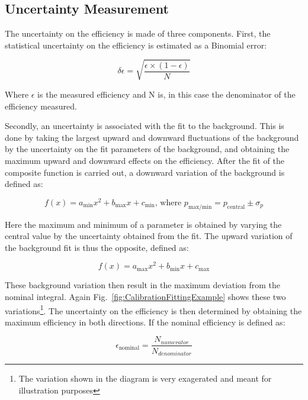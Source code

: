 \subsection{Uncertainty Measurement}

The uncertainty on the efficiency is made of three components. First, the statistical uncertainty on the efficiency is estimated as a Binomial error:

\begin{equation}
  \delta\epsilon = \sqrt{\frac{\epsilon\times(1-\epsilon)}{N}}
\end{equation}

Where $\epsilon$ is the measured efficiency and N is, in this case the denominator of the efficiency measured.

Secondly, an uncertainty is associated with the fit to the background. This is done by taking the largest upward and downward fluctuations of the background by the uncertainty on the fit parameters of the background, and obtaining the maximum upward and downward effects on the efficiency. 
After the fit of the composite function is carried out, a downward variation of the background is defined as:

\begin{equation}
  f(x) = a_{\text{min}}x^{2} + b_{\text{max}}x + c_{\text{min}}\text{, where }p_{\text{max/min}}=p_{\text{central}}\pm\sigma_{p}
\end{equation}

Here the maximum and minimum of a parameter is obtained by varying the central value by the uncertainty obtained from the fit. The upward variation of the background fit is thus the opposite, defined as:

\begin{equation}
  f(x) = a_{\text{max}}x^{2} + b_{\text{min}}x + c_{\text{max}}
\end{equation}

These background variation then result in the maximum deviation from the nominal integral. Again Fig.~\ref{fig:CalibrationFittingExample} shows these two variations\footnote{The variation shown in the diagram is very exagerated and meant for illustration purposes}. The uncertainty on the efficiency is then determined by obtaining the maximum efficiency in both directions. If the nominal efficiency is defined as:

\begin{equation}
  \epsilon_{\text{nominal}} = \frac{N_{numerator}}{N_{denominator}}
\end{equation}

